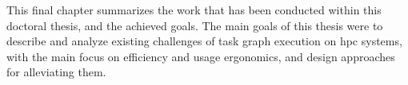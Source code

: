 This final chapter summarizes the work that has been conducted within this doctoral thesis, and the
achieved goals. The main goals of this thesis were to describe and analyze existing challenges of
task graph execution on \gls{hpc} systems, with the main focus on efficiency and usage
ergonomics, and design approaches for alleviating them.

